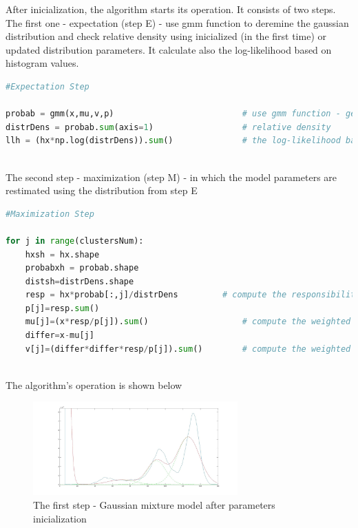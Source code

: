 After inicialization, the algorithm starts its operation. It consists of two steps. The first one - expectation (step E) - use gmm function to deremine the gaussian distribution and check relative density using inicialized (in the first time) or updated distribution parameters. It calculate also the log-likelihood based on histogram values. 

\begin{lstlisting}[language=Python, caption = Segmentation - step E]
#Expectation Step

probab = gmm(x,mu,v,p)							# use gmm function - get probability
distrDens = probab.sum(axis=1)					# relative density 
llh = (hx*np.log(distrDens)).sum()				# the log-likelihood base on histogram data
\end{lstlisting}\\

The second step - maximization (step M) -  in which the model parameters are restimated using the distribution from step E

\begin{lstlisting}[language=Python, caption = Segmentation - step M]
#Maximization Step

for j in range(clustersNum):
    hxsh = hx.shape
    probabxh = probab.shape
    distsh=distrDens.shape
    resp = hx*probab[:,j]/distrDens			# compute the responsibilities
    p[j]=resp.sum()
    mu[j]=(x*resp/p[j]).sum()					# compute the weighted of expected values
    differ=x-mu[j]
    v[j]=(differ*differ*resp/p[j]).sum()		# compute the weighted varainces	
\end{lstlisting}\\

The algorithm's operation is shown below 

\begin{figure}[H]
	\centering{}\includegraphics[width=0.7\textwidth]{figures/Module_09/m09_13}
	\caption{The first step - Gaussian mixture model after parameters inicialization
	\label{fig:figures/m09_13}}
\end{figure} 

